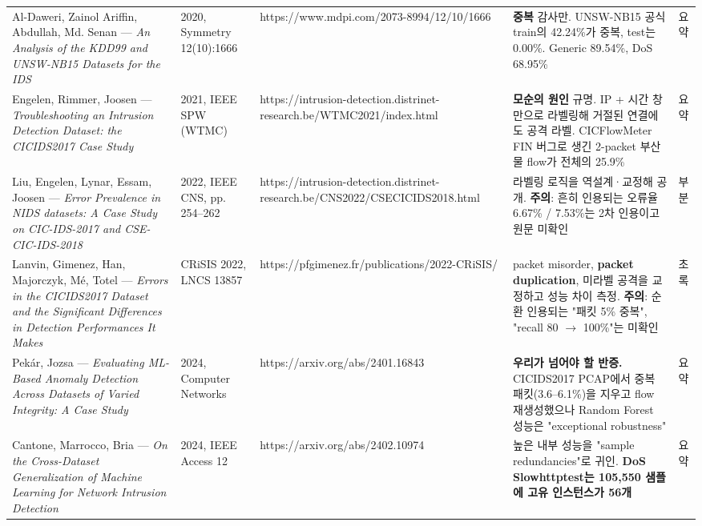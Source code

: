 \begin{longtable}
{}Al-Daweri, Zainol Ariffin, Abdullah, Md. Senan — \emph{An Analysis of the KDD99 and UNSW-NB15 Datasets for the IDS} & 2020, Symmetry 12(10):1666 & https:/\allowbreak{}/\allowbreak{}www.mdpi.com/\allowbreak{}2073-8994/\allowbreak{}12/\allowbreak{}10/\allowbreak{}1666 & \textbf{중복} 감사만. UNSW-NB15 공식 train의 42.24\%가 중복, test는 0.00\%. Generic 89.54\%, DoS 68.95\% & 요약 \\
{}Engelen, Rimmer, Joosen — \emph{Troubleshooting an Intrusion Detection Dataset: the CICIDS2017 Case Study} & 2021, IEEE SPW (WTMC) & https:/\allowbreak{}/\allowbreak{}intrusion-detection.distrinet-research.be/\allowbreak{}WTMC2021/\allowbreak{}index.html & \textbf{모순의 원인} 규명. IP +\allowbreak{} 시간 창만으로 라벨링해 거절된 연결에도 공격 라벨. CICFlowMeter FIN 버그로 생긴 2-packet 부산물 flow가 전체의 25.9\% & 요약 \\
{}Liu, Engelen, Lynar, Essam, Joosen — \emph{Error Prevalence in NIDS datasets: A Case Study on CIC-IDS-2017 and CSE-CIC-IDS-2018} & 2022, IEEE CNS, pp. 254–262 & https:/\allowbreak{}/\allowbreak{}intrusion-detection.distrinet-research.be/\allowbreak{}CNS2022/\allowbreak{}CSECICIDS2018.html & 라벨링 로직을 역설계·교정해 공개. \textbf{주의}: 흔히 인용되는 오류율 6.67\% /\allowbreak{} 7.53\%는 2차 인용이고 원문 미확인 & 부분 \\
{}Lanvin, Gimenez, Han, Majorczyk, Mé, Totel — \emph{Errors in the CICIDS2017 Dataset and the Significant Differences in Detection Performances It Makes} & CRiSIS 2022, LNCS 13857 & https:/\allowbreak{}/\allowbreak{}pfgimenez.fr/\allowbreak{}publications/\allowbreak{}2022-CRiSIS/\allowbreak{} & packet misorder, \textbf{packet duplication}, 미라벨 공격을 교정하고 성능 차이 측정. \textbf{주의}: 순환 인용되는 "패킷 5\% 중복", "recall 80 \ensuremath{\rightarrow} 100\%"는 미확인 & 초록 \\
{}Pekár, Jozsa — \emph{Evaluating ML-Based Anomaly Detection Across Datasets of Varied Integrity: A Case Study} & 2024, Computer Networks & https:/\allowbreak{}/\allowbreak{}arxiv.org/\allowbreak{}abs/\allowbreak{}2401.16843 & \textbf{우리가 넘어야 할 반증.} CICIDS2017 PCAP에서 중복 패킷(3.6–6.1\%)을 지우고 flow 재생성했으나 Random Forest 성능은 "exceptional robustness" & 요약 \\
{}Cantone, Marrocco, Bria — \emph{On the Cross-Dataset Generalization of Machine Learning for Network Intrusion Detection} & 2024, IEEE Access 12 & https:/\allowbreak{}/\allowbreak{}arxiv.org/\allowbreak{}abs/\allowbreak{}2402.10974 & 높은 내부 성능을 "sample redundancies"로 귀인. \textbf{DoS Slowhttptest는 105,550 샘플에 고유 인스턴스가 56개} & 요약 \\
\bottomrule
\end{longtable}
\endgroup
